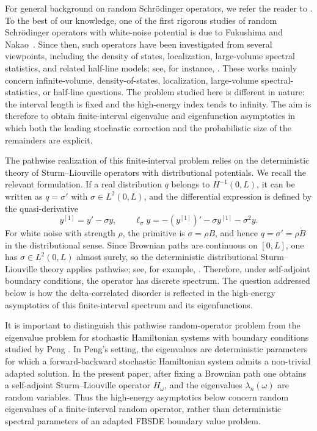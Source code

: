\documentclass[11pt]{article}
\begin{document}
For general background on random Schr\"{o}dinger operators, we refer the reader to \cite{CarmonaLacroix,PasturFigotin,Kirsch2008}. To the best of our knowledge, one of the first rigorous studies of random Schr\"{o}dinger operators with white-noise potential is due to Fukushima and Nakao~\cite{FukushimaNakao}. Since then, such operators have been investigated from several viewpoints, including the density of states, localization, large-volume spectral statistics, and related half-line models; see, for instance, \cite{Thompson1983,DumazLabbe2020,DumazLabbe2023,DumazLabbe2024,DumazLabbe2024Crossover,Minami,RRV}. These works mainly concern infinite-volume, density-of-states, localization, large-volume spectral-statistics, or half-line questions. The problem studied here is different in nature: the interval length is fixed and the high-energy index tends to infinity. The aim is therefore to obtain finite-interval eigenvalue and eigenfunction asymptotics in which both the leading stochastic correction and the probabilistic size of the remainders are explicit.

The pathwise realization of this finite-interval problem relies on the deterministic theory of Sturm--Liouville operators with distributional potentials. We recall the relevant formulation. If a real distribution \(q\) belongs to \(H^{-1}(0,L)\), it can be written as \(q=\sigma'\) with \(\sigma\in L^2(0,L)\), and the differential expression is defined by the quasi-derivative
\[
    y^{[1]}=y'-\sigma y,
    \qquad
    \ell_\sigma y=-(y^{[1]})'-\sigma y^{[1]}-\sigma^2y.
\]
For white noise with strength \(\rho\), the primitive is \(\sigma=\rho B\), and hence \(q=\sigma'=\rho\dot B\) in the distributional sense. Since Brownian paths are continuous on \([0,L]\), one has \(\sigma\in L^2(0,L)\) almost surely, so the deterministic distributional Sturm--Liouville theory applies pathwise; see, for example, \cite{HrynivMykytyuk2006,SavchukShkalikov,HrynivMykytyuk2012}. Therefore, under self-adjoint boundary conditions, the operator has discrete spectrum. The question addressed below is how the delta-correlated disorder is reflected in the high-energy asymptotics of this finite-interval spectrum and its eigenfunctions.

It is important to distinguish this pathwise random-operator problem from the eigenvalue problem for stochastic Hamiltonian systems with boundary conditions studied by Peng \cite{Peng2000}. In Peng's setting, the eigenvalues are deterministic parameters for which a forward-backward stochastic Hamiltonian system admits a non-trivial adapted solution. In the present paper, after fixing a Brownian path one obtains a self-adjoint Sturm--Liouville operator \(H_\omega\), and the eigenvalues \(\lambda_n(\omega)\) are random variables. Thus the high-energy asymptotics below concern random eigenvalues of a finite-interval random operator, rather than deterministic spectral parameters of an adapted FBSDE boundary value problem.
\end{document}
